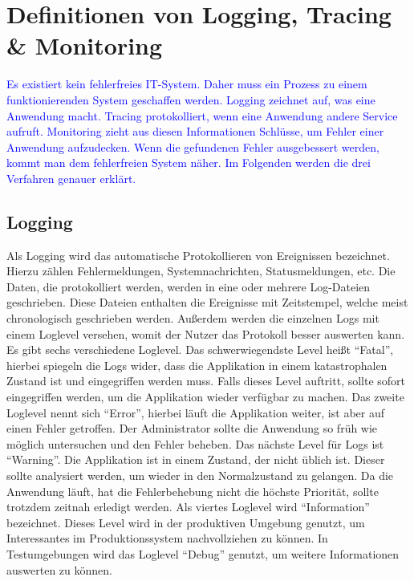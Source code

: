 \chapter{Definitionen von Logging, Tracing {\selectfont \&} Monitoring}\label{ch:definition-von-logging-tracing-&-monitoring}
\textcolor{blue}{
    Es existiert kein fehlerfreies IT-System.
    Daher muss ein Prozess zu einem funktionierenden System geschaffen werden.
    Logging zeichnet auf, was eine Anwendung macht.
    Tracing protokolliert, wenn eine Anwendung andere Service aufruft.
    Monitoring zieht aus diesen Informationen Schlüsse, um Fehler einer Anwendung aufzudecken.
    Wenn die gefundenen Fehler ausgebessert werden, kommt man dem fehlerfreien System näher.
    Im Folgenden werden die drei Verfahren genauer erklärt.
}


\section{Logging}\label{sec:logging}
Als Logging wird das automatische Protokollieren von Ereignissen bezeichnet.
Hierzu zählen Fehlermeldungen, Systemnachrichten, Statusmeldungen, etc.
Die Daten, die protokolliert werden, werden in eine oder mehrere Log-Dateien geschrieben.
Diese Dateien enthalten die Ereignisse mit Zeitstempel, welche meist chronologisch geschrieben werden.
Außerdem werden die einzelnen Logs mit einem Loglevel versehen, womit der Nutzer das Protokoll besser auswerten kann.
Es gibt sechs verschiedene Loglevel.
Das schwerwiegendste Level heißt \enquote{Fatal}, hierbei spiegeln die Logs wider, dass die Applikation in einem katastrophalen Zustand ist und eingegriffen werden muss.
Falls dieses Level auftritt, sollte sofort eingegriffen werden, um die Applikation wieder verfügbar zu machen.
Das zweite Loglevel nennt sich \enquote{Error}, hierbei läuft die Applikation weiter, ist aber auf einen Fehler getroffen.
Der Administrator sollte die Anwendung so früh wie möglich untersuchen und den Fehler beheben.
Das nächste Level für Logs ist \enquote{Warning}.
Die Applikation ist in einem Zustand, der nicht üblich ist.
Dieser sollte analysiert werden, um wieder in den Normalzustand zu gelangen.
Da die Anwendung läuft, hat die Fehlerbehebung nicht die höchste Priorität, sollte trotzdem zeitnah erledigt werden.
Als viertes Loglevel wird \enquote{Information} bezeichnet.
Dieses Level wird in der produktiven Umgebung genutzt, um Interessantes im Produktionssystem nachvollziehen zu können.
In Testumgebungen wird das Loglevel \enquote{Debug} genutzt, um weitere Informationen auswerten zu können.
